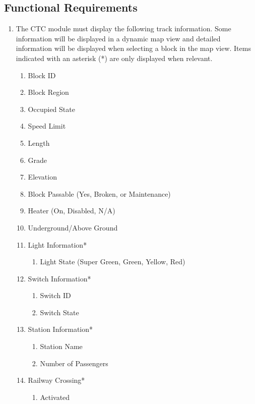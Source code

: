 \documentclass{scrreprt}
\begin{document}
\subsection{Functional Requirements}
\begin{enumerate}
    \item The CTC module must display the following track information. Some information
    will be displayed in a dynamic map view and detailed information will be displayed
    when selecting a block in the map view. Items indicated with an asterisk (*) are only 
    displayed when relevant. 
    \begin{enumerate}
        \item Block ID
        \item Block Region
        \item Occupied State
        \item Speed Limit
        \item Length
        \item Grade
        \item Elevation
        \item Block Passable (Yes, Broken, or Maintenance)
        \item Heater (On, Disabled, N/A)
        \item Underground/Above Ground
        \item Light Information* 
        \begin{enumerate}
            \item Light State (Super Green, Green, Yellow, Red)
        \end{enumerate}
        \item Switch Information* 
        \begin{enumerate}
            \item Switch ID
            \item Switch State
        \end{enumerate}
        \item Station Information* 
        \begin{enumerate}
            \item Station Name
            \item Number of Passengers
        \end{enumerate}
        \item Railway Crossing*
        \begin{enumerate}
          \item Activated
        \end{enumerate}

\end{enumerate}
\end{enumerate}
\end{document}

